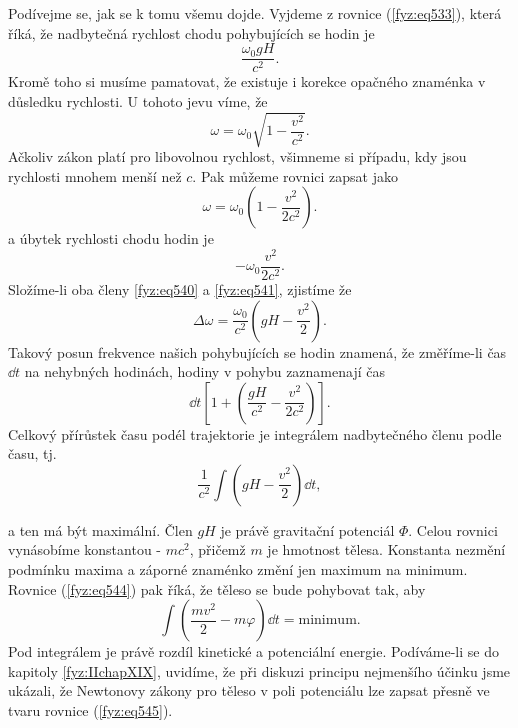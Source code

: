     Podívejme se, jak se k tomu všemu dojde. Vyjdeme z rovnice (\ref{fyz:eq533}), která říká, že 
    nadbytečná rychlost chodu pohybujících se hodin je    
    \begin{equation}\label{fyz:eq540}
      \dfrac{\omega_0gH}{c^2}.
    \end{equation}
    Kromě toho si musíme pamatovat, že existuje i korekce opačného znaménka v důsledku rychlosti. U 
    tohoto jevu víme, že    
    \begin{equation*}
      \omega = \omega_0\sqrt{1 - \dfrac{v^2}{c^2}}.
    \end{equation*}
    Ačkoliv zákon platí pro libovolnou rychlost, všimneme si případu, kdy jsou rychlosti mnohem 
    menší než \(c\). Pak můžeme rovnici zapsat jako
    \begin{equation*}
      \omega = \omega_0\left(1 - \dfrac{v^2}{2c^2}\right).
    \end{equation*}
    a úbytek rychlosti chodu hodin je
    \begin{equation}\label{fyz:eq541}
      -\omega_0\dfrac{v^2}{2c^2}.
    \end{equation}
    Složíme-li oba členy \ref{fyz:eq540} a \ref{fyz:eq541}, zjistíme že 
    \begin{equation}\label{fyz:eq542}
      \Delta\omega = \dfrac{\omega_0}{c^2}\left(gH - \dfrac{v^2}{2}\right).
    \end{equation}
    Takový posun frekvence našich pohybujících se hodin znamená, že změříme-li čas \(\dd{t}\) na 
    nehybných hodinách, hodiny v pohybu zaznamenají čas
    \begin{equation}\label{fyz:eq543}
     \dd{t}\left[1 + \left(\dfrac{gH}{c^2} - \dfrac{v^2}{2c^2}\right)\right].
    \end{equation}
    Celkový přírůstek času podél trajektorie je integrálem nadbytečného členu podle času, tj.
    \begin{equation}\label{fyz:eq544}
      \dfrac{1}{c^2}\int\left(gH - \frac{v^2}{2}\right)\dd{t},
    \end{equation}

    a ten má být maximální. Člen \(gH\) je právě gravitační potenciál \(\varPhi\). Celou rovnici 
    vynásobíme konstantou - \(mc^2\), přičemž \(m\) je hmotnost tělesa. Konstanta nezmění podmínku 
    maxima a záporné znaménko změní jen maximum na minimum. Rovnice (\ref{fyz:eq544}) pak říká, že 
    těleso se bude pohybovat tak, aby
    \begin{equation}\label{fyz:eq545}
      \int\left(\dfrac{mv^2}{2} - m\varphi\right)\dd{t} = \text{minimum}.
    \end{equation}
    Pod integrálem je právě rozdíl kinetické a potenciální energie. Podíváme-li se do kapitoly
    \ref{fyz:IIchapXIX}, uvidíme, že při diskuzi principu nejmenšího účinku jsme ukázali, že
    Newtonovy zákony pro těleso v poli potenciálu lze zapsat přesně ve tvaru rovnice
    (\ref{fyz:eq545}).
    
